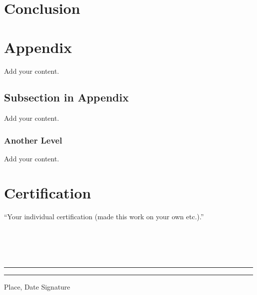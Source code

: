 \documentclass[
	12pt,
	a4paper,
	american,
	oneside
	]{scrartcl}
\begin{document}
	\lipsum
	
	\clearpage
	\FloatBarrier
	\section{Conclusion}\label{sec:conclusion}
	
	\lipsum
	
	\clearpage
	\FloatBarrier
	
	
	\printbibliography
	
	
	\FloatBarrier
	\appendix
	\section{Appendix}
	
	Add your content.
	
	\subsection{Subsection in Appendix}
	
	Add your content.
	
	\subsubsection{Another Level}
	
	Add your content.
	
	
	
	\section*{Certification}
	``Your individual certification (made this work on your own etc.).''
	\paragraph{}$~~$\\
	\paragraph{}$~~$\\
	\noindent\rule{5cm}{.4pt}\hfill\rule{5cm}{.4pt}\par
	\noindent Place, Date \hfill Signature 
\end{document}
